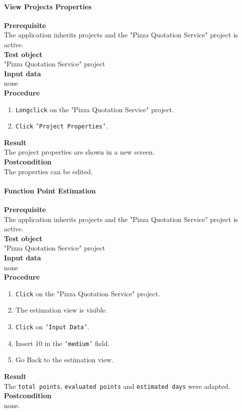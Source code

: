 \paragraph*{\textbf{View Projects Properties}}
\textbf{Prerequisite}\\
The application inherits projects and the "Pizza Quotation Service" project is active.\\
\textbf{Test object}\\
"Pizza Quotation Service" project\\
\textbf{Input data}\\
none\\
\textbf{Procedure}
\begin{enumerate}
	\item \texttt{Longclick} on the "Pizza Quotation Service" project.
	\item \texttt{Click} \texttt{'Project Properties'}.
\end{enumerate}
\textbf{Result}\\
The project properties are shown in a new screen.\\
\textbf{Postcondition}\\
The properties can be edited.
\paragraph*{\textbf{Function Point Estimation}}
\textbf{Prerequisite}\\
The application inherits projects and the "Pizza Quotation Service" project is active.\\
\textbf{Test object}\\
"Pizza Quotation Service" project\\
\textbf{Input data}\\
none\\
\textbf{Procedure}
\begin{enumerate}
	\item \texttt{Click} on the "Pizza Quotation Service" project.
	\item The estimation view is visible.
	\item \texttt{Click} on \texttt{'Input Data'}.
	\item Insert 10 in the \texttt{'medium'} field.
	\item Go Back to the estimation view.
\end{enumerate}
\textbf{Result}\\
The \texttt{total points}, \texttt{evaluated points} and \texttt{estimated days} were adapted.\\
\textbf{Postcondition}\\
none.
